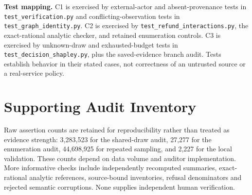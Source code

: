 \documentclass[conference]{IEEEtran}
\begin{document}
\textbf{Test mapping.} C1 is exercised by external-actor and absent-provenance
tests in \texttt{test\_verification.py} and conflicting-observation tests in
\texttt{test\_graph\_identity.py}. C2 is exercised by
\texttt{test\_refund\_interactions.py}, the exact-rational analytic checker,
and retained enumeration controls. C3 is exercised by unknown-draw and
exhausted-budget tests in \texttt{test\_decision\_shapley.py}, plus the
saved-evidence branch audit. Tests establish behavior in their stated cases,
not correctness of an untrusted source or a real-service policy.

\section{Supporting Audit Inventory}
Raw assertion counts are retained for reproducibility rather than treated as
evidence strength: 3,283,523 for the shared-draw audit, 27,277 for the enumeration
audit, 44,698,925 for repeated sampling, and 2,227 for the local validation.
These counts depend on data volume and auditor implementation. More informative
checks include independently recomputed summaries, exact-rational analytic
references, source-bound inventories, refusal denominators and rejected
semantic corruptions. None supplies independent human verification.
\end{document}
